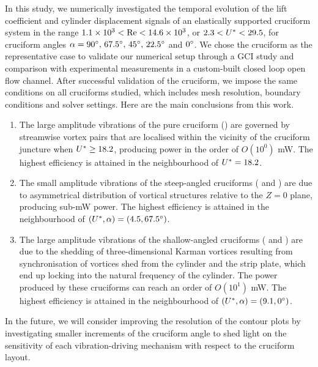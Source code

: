\documentclass[oneside]{utmthesis}
\begin{document}
In this study, we numerically investigated the temporal evolution of the lift coefficient and cylinder displacement signals of an elastically supported cruciform system in the range $1.1 \times 10^{3} < \text{Re} < 14.6 \times 10^{3}$, or $2.3 < U^{*} < 29.5$, for cruciform angles $\alpha = \angfi,\,\angfo,\,\angth,\,\angtw$ and $\angon$. We chose the \angfi{} cruciform as the representative case to validate our numerical setup through a GCI study and comparison with experimental measurements in a custom-built closed loop open flow channel. After successful validation of the \angfi{} cruciform, we impose the same conditions on all cruciforms studied, which includes mesh resolution, boundary conditions and solver settings. Here are the main conclusions from this work.
\renewcommand{\labelenumi}{(\alph{enumi})}
\begin{enumerate}
  \item The large amplitude vibrations of the pure cruciform (\angfi{}) are governed by streamwise vortex pairs that are localised within the vicinity of the cruciform juncture when $U^{*} \geq 18.2$, producing power in the order of $O(10^{0})$ \si{\milli\watt}. The highest efficiency is attained in the neighbourhood of $U^{*} = 18.2$.
  \item The small amplitude vibrations of the steep-angled cruciforms (\angfo{} and \angth{}) are due to asymmetrical distribution of vortical structures relative to the $Z = 0$ plane, producing sub-\si{\milli\watt} power. The highest efficiency is attained in the neighbourhood of $(\ured,\alpha) = (\urtw,\angfo)$.
  \item The large amplitude vibrations of the shallow-angled cruciforms (\angtw{} and \angon{}) are due to the shedding of three-dimensional Karman vortices resulting from synchronisation of vortices shed from the cylinder and the strip plate, which end up locking into the natural frequency of the cylinder. The power produced by these cruciforms can reach an order of $O(10^{1})$ \si{\milli\watt}. The highest efficiency is attained in the neighbourhood of $(\ured,\alpha) = (\urfo,\angon)$.
\end{enumerate} \label{item:conclusion}

In the future, we will consider improving the resolution of the contour plots by investigating smaller increments of the cruciform angle to shed light on the sensitivity of each vibration-driving mechanism with respect to the cruciform layout.
\end{document}
